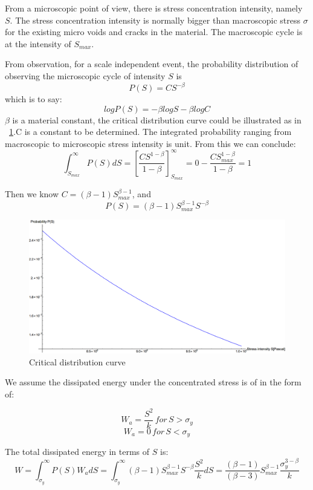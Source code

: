 \documentclass[3p,times,procedia,number]{elsarticle}
\newcommand{\figref}[1]{\figurename~\ref{#1}}
\begin{document}
From a microscopic point of view, there is stress concentration intensity, namely $S$. The stress concentration intensity is normally bigger than macroscopic stress $\sigma$ for the existing micro voids and cracks in the material. The macroscopic cycle is at the intensity of $S_{max}$.

From observation, for a scale independent event, the probability distribution of observing the microscopic cycle of intensity $S$ is 
\begin{equation}
P(S)=CS^{-\beta}
\end{equation}
which is to say:
$$logP(S)=-\beta logS-\beta logC$$
$\beta$ is a material constant, the critical distribution curve could be illustrated as in \figref{distribution}.C is a constant to be determined. The integrated probability ranging from macroscopic to microscopic stress intensity is unit. From this we can conclude:
$$\int_{S_{max}}^{\infty}P(S)dS=\left[ \frac{CS^{1-\beta}}{1-\beta}\right] _{S_{max}}^\infty=0-\frac{CS_{max}^{1-\beta}}{1-\beta}=1$$

Then we know $C=(\beta-1)S_{max}^{\beta-1}$, and $$P(S)=(\beta-1)S_{max}^{\beta-1}S^{-\beta}$$

\begin{figure}[h!]
		\includegraphics[width=\textwidth]{figures//distribution.png} 
		\caption{Critical distribution curve}
		\label{distribution}
\end{figure}

We assume the dissipated energy under the concentrated stress is of in the form of:

$$W_a=\frac{S^2}{k} \, for \, S>\sigma_y$$
$$W_a=0 \, for \, S<\sigma_y$$

The total dissipated energy in terms of $S$ is:
\begin{equation}
W=\int_{\sigma_y}^{\infty}P(S)W_adS=\int_{\sigma_y}^{\infty}(\beta-1)S_{max}^{\beta-1}S^{-\beta}\frac{S^2}{k}dS=\frac{(\beta-1)}{(\beta-3)}S_{max}^{\beta-1}\frac{\sigma_y^{3-\beta}}{k}
\end{equation}
\end{document}
